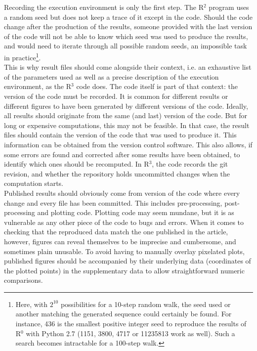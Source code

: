 \documentclass[a4paper,11pt]{article}
\begin{document}
Recording the execution environment is only the first step. The R$^2$ program uses a random seed but does not keep a trace of it except in the code. Should the code change after the production of the results, someone provided with the last version of the code will not be able to know which seed was used to produce the results, and would need to iterate through all possible random seeds, an impossible task in practice\footnote{Here, with $2^{10}$ possibilities for a 10-step random walk, the seed used or another matching the generated sequence could certainly be found. For instance, 436 is the smallest positive integer seed to reproduce the results of R$^0$ with Python 2.7 (1151, 3800, 4717 or 11235813 work as well). Such a search becomes intractable for a 100-step walk.}.\\

This is why result files should come alongside their context, i.e. an exhaustive list of the parameters used as well as a precise description of the execution environment, as the R$^3$ code does. The code itself is part of that context: the version of the code must be recorded. It is common for different results or different figures to have been generated by different versions of the code. Ideally, all results should originate from the same (and last) version of the code. But for long or expensive computations, this may not be feasible. In that case, the result files should contain the version of the code that was used to produce it. This information can be obtained from the version control software. This also allows, if some errors are found and corrected after some results have been obtained, to identify which ones should be recomputed. In R$^3$, the code records the git revision, and whether the repository holds uncommitted changes when the computation starts.\\

Published results should obviously come from version of the code where every change and every file has been committed. This includes pre-processing, post-processing and plotting code. Plotting code may seem mundane, but it is as vulnerable as any other piece of the code to bugs and errors.
When it comes to checking that the reproduced data match the one published in the article, however, figures can reveal themselves to be imprecise and cumbersome, and sometimes plain unusable. To avoid having to manually overlay pixelated plots, published figures should be accompanied by their underlying data (coordinates of the plotted points) in the supplementary data to allow straightforward numeric comparisons.\\
\end{document}
